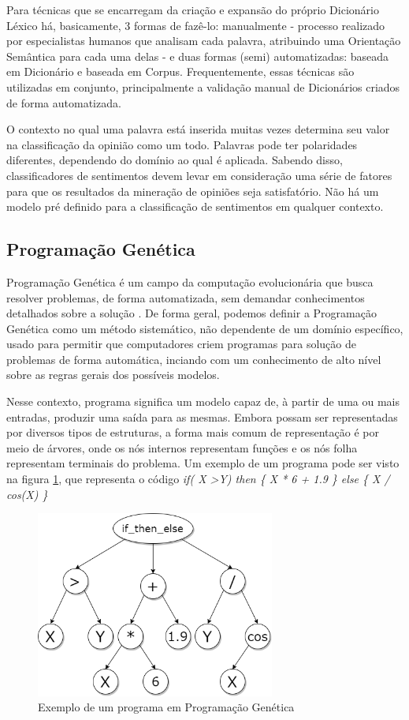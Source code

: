 \documentclass[12pt]{article}
\begin{document}
Para técnicas que se encarregam da criação e expansão do próprio Dicionário Léxico há, basicamente, 3 formas de fazê-lo: manualmente -  processo realizado por especialistas humanos que analisam cada palavra, atribuindo uma Orientação Semântica para cada uma delas -  e duas formas (semi) automatizadas: baseada em Dicionário e baseada em Corpus. Frequentemente, essas técnicas são utilizadas em conjunto, principalmente a validação manual de Dicionários criados de forma automatizada.

O contexto no qual uma palavra está inserida muitas vezes determina seu valor na classificação da opinião como um todo. Palavras pode ter polaridades diferentes, dependendo do domínio ao qual é aplicada. Sabendo disso, classificadores de sentimentos devem levar em consideração uma série de fatores para que os resultados da mineração de opiniões seja satisfatório. Não há um modelo pré definido para a classificação de sentimentos em qualquer contexto.

\subsection{Programação Genética}
\label{progGen}
Programação Genética é um campo da computação evolucionária que busca resolver problemas, de forma automatizada, sem demandar conhecimentos detalhados sobre a solução \cite{koza1992genetic}. De forma geral, podemos definir a Programação Genética como um método sistemático, não dependente de um domínio específico, usado para permitir que computadores criem programas para solução de problemas de forma automática, inciando com um conhecimento de alto nível sobre as regras gerais dos possíveis modelos.

Nesse contexto, programa significa um modelo capaz de, à partir de uma ou mais entradas, produzir uma saída para as mesmas. Embora possam ser representadas por diversos tipos de estruturas, a forma mais comum de representação é por meio de árvores, onde os nós internos representam funções e os nós folha representam terminais do problema. Um exemplo de um programa pode ser visto na figura \ref{treeProgram}, que representa o código \emph{if( X \textgreater Y) then \{ X * 6 +  1.9 \} else \{ X / cos(X) \}}

\begin{figure}[!htb]
	\centering
	\includegraphics[width=0.7\textwidth]{treeGP2}
	\caption{Exemplo de um programa em Programação Genética}
	\label{treeProgram}
\end{figure}
\end{document}
